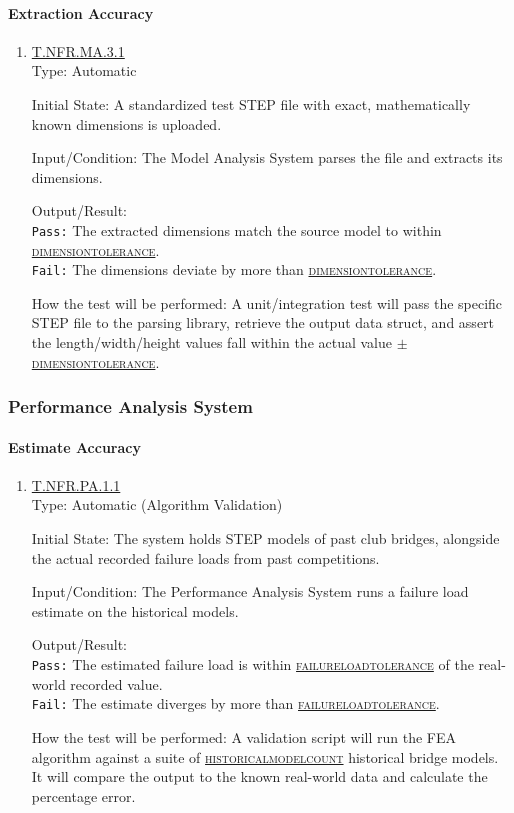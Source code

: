 \documentclass[12pt, titlepage]{article}
\newcommand{\testdef}[1]{\leavevmode\hypertarget{test:#1}{}\hyperlink{trace:#1}{#1}}
\DeclareRobustCommand{\cname}[1]{{\renewcommand{\_}{\textunderscore\allowbreak}\textsc{#1}}}
\newcommand{\constfirst}[1]{\leavevmode\hypertarget{constfirst:\detokenize{#1}}{}\hyperlink{const:\detokenize{#1}}{\cname{#1}}}
\newcommand{\const}[1]{\hyperlink{const:\detokenize{#1}}{\cname{#1}}}
\begin{document}
\paragraph{Extraction Accuracy}
\begin{enumerate}
  \item \testdef{T.NFR.MA.3.1}\\
  Type: Automatic

  Initial State: A standardized test STEP file with exact, mathematically known dimensions is uploaded.

  Input/Condition: The Model Analysis System parses the file and extracts its dimensions.

  Output/Result: \\
  \texttt{Pass:} The extracted dimensions match the source model to within \const{dimension\_tolerance}.\\
  \texttt{Fail:} The dimensions deviate by more than \const{dimension\_tolerance}.

  How the test will be performed: A unit/integration test will pass the specific STEP file to the parsing library, retrieve the output data struct, and assert the length/width/height values fall within the actual value $\pm$ \const{dimension\_tolerance}.
\end{enumerate}


\subsubsection{Performance Analysis System}

\paragraph{Estimate Accuracy}
\begin{enumerate}
  \item \testdef{T.NFR.PA.1.1}\\
  Type: Automatic (Algorithm Validation)

  Initial State: The system holds STEP models of past club bridges, alongside the actual recorded failure loads from past competitions.

  Input/Condition: The Performance Analysis System runs a failure load estimate on the historical models.

  Output/Result: \\
  \texttt{Pass:} The estimated failure load is within \constfirst{failure\_load\_tolerance} of the real-world recorded value.\\
  \texttt{Fail:} The estimate diverges by more than \const{failure\_load\_tolerance}.

  How the test will be performed: A validation script will run the FEA algorithm against a suite of \constfirst{historical\_model\_count} historical bridge models. It will compare the output to the known real-world data and calculate the percentage error.
\end{enumerate}
\end{document}
